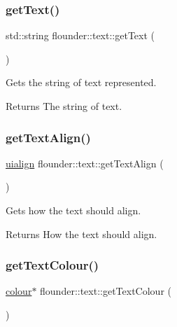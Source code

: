 \subsubsection{\texorpdfstring{get\+Text()}{getText()}}
{\footnotesize\ttfamily std\+::string flounder\+::text\+::get\+Text (\begin{DoxyParamCaption}{ }\end{DoxyParamCaption})\hspace{0.3cm}{\ttfamily [inline]}}



Gets the string of text represented. 

\begin{DoxyReturn}{Returns}
The string of text. 
\end{DoxyReturn}
\mbox{\label{classflounder_1_1text_a494f99a95dde793f20e9d2a46f34b217}} 
\subsubsection{\texorpdfstring{get\+Text\+Align()}{getTextAlign()}}
{\footnotesize\ttfamily \hyperlink{namespaceflounder_a70f1871d5c05aa8e078dd37501ce10a9}{uialign} flounder\+::text\+::get\+Text\+Align (\begin{DoxyParamCaption}{ }\end{DoxyParamCaption})\hspace{0.3cm}{\ttfamily [inline]}}



Gets how the text should align. 

\begin{DoxyReturn}{Returns}
How the text should align. 
\end{DoxyReturn}
\mbox{\label{classflounder_1_1text_a583497e298f908f71d7d3982999eccbb}} 
\subsubsection{\texorpdfstring{get\+Text\+Colour()}{getTextColour()}}
{\footnotesize\ttfamily \hyperlink{classflounder_1_1colour}{colour}$\ast$ flounder\+::text\+::get\+Text\+Colour (\begin{DoxyParamCaption}{ }\end{DoxyParamCaption})\hspace{0.3cm}{\ttfamily [inline]}}



